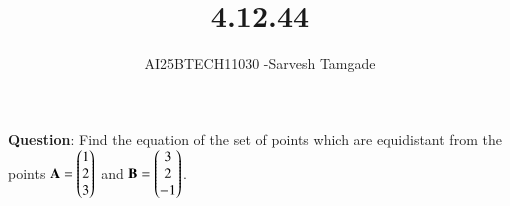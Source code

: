 \documentclass[journal]{IEEEtran}
\begin{document}

\vspace{3cm}

\title{4.12.44}
\author{AI25BTECH11030 -Sarvesh Tamgade}
{\let\newpage\relax\maketitle}

\renewcommand{\thefigure}{\theenumi}
\renewcommand{\thetable}{\theenumi}
\setlength{\intextsep}{10pt} 


\renewcommand{\thetable}{\theenumi}


\textbf{Question}: Find the equation of the set of points which are equidistant from the points \(\mathbf{A} = \begin{pmatrix}1 \\ 2 \\ 3\end{pmatrix}\) and \(\mathbf{B} = \begin{pmatrix}3 \\ 2 \\ -1\end{pmatrix}\).
\end{document}
